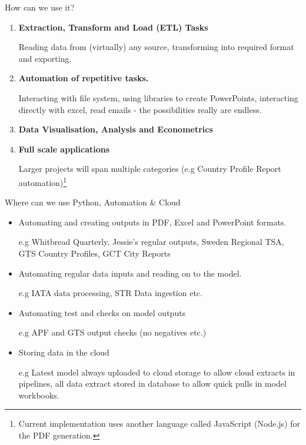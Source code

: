 \documentclass[aspectratio=169]{beamer}
\begin{document}
\begin{frame}{How can we use it?}

\begin{enumerate}
	\item \textbf{Extraction, Transform and Load (ETL) Tasks}

			Reading data from (virtually) any source, transforming into required format and exporting.
	
	\item \textbf{Automation of repetitive tasks.}
	
			Interacting with file system, using libraries to create PowerPoints, interacting directly with excel, read emails - the possibilities really are endless.
			
	\item \textbf{Data Visualisation, Analysis and Econometrics}
	
	\item \textbf{Full scale applications}
		
			Larger projects will span multiple categories (e.g Country Profile Report automation)\footnote{Current implementation uses another language called JavaScript (Node.js) for the PDF generation.}
	
\end{enumerate}
	
\end{frame}

\begin{frame}{Where can we use Python, Automation \& Cloud}

\begin{itemize}
\item Automating and creating outputs in PDF, Excel and PowerPoint formats.

 		{\small e.g Whitbread Quarterly, Jessie's regular outputs, Sweden Regional TSA, GTS Country Profiles, GCT City Reports}
 		
 \item {Automating regular data inputs and reading on to the model.} 
 
 		{\small e.g IATA data processing, STR Data ingestion etc.}
 		
 \item{Automating test and checks on model outputs}
 
	 {\small e.g APF and GTS output checks (no negatives etc.)}
	 
	 
 \item{Storing data in the cloud}
 
	 {\small e.g Latest model always uploaded to cloud storage to allow cloud extracts in pipelines, all data extract stored in database to allow quick pulls in model workbooks.}
 		
\end{itemize}

	
\end{frame}
\end{document}
